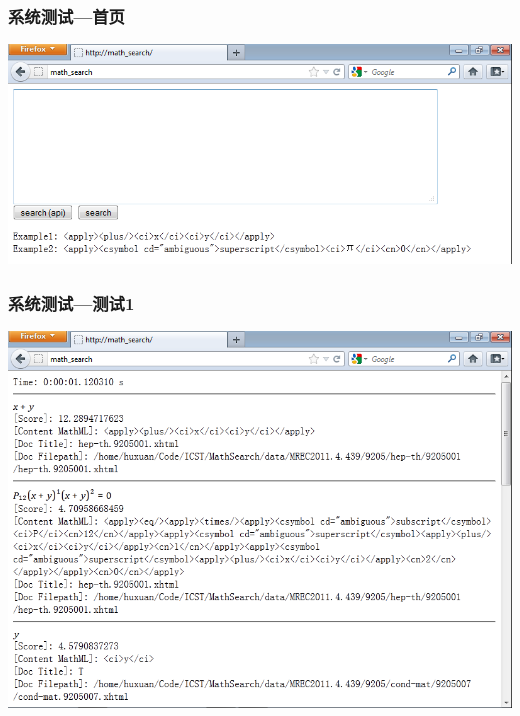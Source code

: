 \documentclass[17pt]{beamer}
\begin{document}
    \begin{frame}
        \frametitle{系统测试---首页}
        \begin{center}
            \includegraphics[width=.8\paperwidth]{pic/test_index.png}
        \end{center}
    \end{frame}

    \begin{frame}
        \frametitle{系统测试---测试1}
        \begin{center}
            \includegraphics[width=.7\paperwidth]{pic/test1.png}
        \end{center}
    \end{frame}
\end{document}
